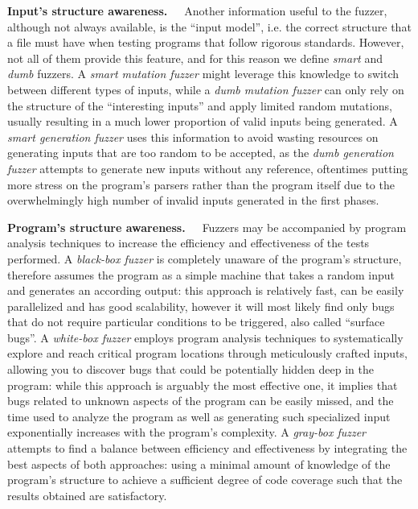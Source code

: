 \textbf{Input's structure awareness.}\ \ \ Another information useful to the fuzzer, although not always available, is the ``input model'', i.e. the correct structure that a file must have when testing programs that follow rigorous standards. However, not all of them provide this feature, and for this reason we define \textit{smart} and \textit{dumb} fuzzers.
A \textit{smart mutation fuzzer} might leverage this knowledge to switch between different types of inputs, while a \textit{dumb mutation fuzzer} can only rely on the structure of the ``interesting inputs'' and apply limited random mutations, usually resulting in a much lower proportion of valid inputs being generated.
A \textit{smart generation fuzzer} uses this information to avoid wasting resources on generating inputs that are too random to be accepted, as the \textit{dumb generation fuzzer} attempts to generate new inputs without any reference, oftentimes putting more stress on the program's parsers rather than the program itself due to the overwhelmingly high number of invalid inputs generated in the first phases.

\textbf{Program's structure awareness.}\ \ \ Fuzzers may be accompanied by program analysis techniques to increase the efficiency and effectiveness of the tests performed. A \textit{black-box fuzzer} is completely unaware of the program's structure, therefore assumes the program as a simple machine that takes a random input and generates an according output: this approach is relatively fast, can be easily parallelized and has good scalability, however it will most likely find only bugs that do not require particular conditions to be triggered, also called ``surface bugs''. A \textit{white-box fuzzer} employs program analysis techniques to systematically explore and reach critical program locations through meticulously crafted inputs, allowing you to discover bugs that could be potentially hidden deep in the program: while this approach is arguably the most effective one, it implies that bugs related to unknown aspects of the program can be easily missed, and the time used to analyze the program as well as generating such specialized input exponentially increases with the program's complexity.
A \textit{gray-box fuzzer} attempts to find a balance between efficiency and effectiveness by integrating the best aspects of both approaches: using a minimal amount of knowledge of the program's structure to achieve a sufficient degree of code coverage such that the results obtained are satisfactory.







